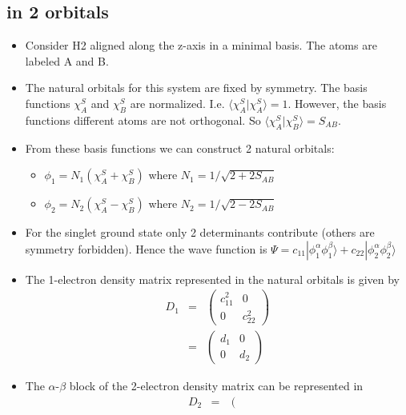 \documentclass[aip,graphicx]{revtex4-1}
\begin{document}
\subsection{ in 2 orbitals}

\begin{itemize}
\item Consider H2 aligned along the z-axis in a minimal basis. The atoms are labeled A and B.
\item The natural orbitals for this system are fixed by symmetry. The basis functions $\chi_A^S$ and 
        $\chi_B^S$ are normalized. I.e. $\langle \chi_A^S|\chi_A^S\rangle = 1$. However, the basis 
        functions  different atoms are not orthogonal. So $\langle \chi_A^S|\chi_B^S\rangle = S_{AB}$.
\item From these basis functions we can construct 2 natural orbitals:
         \begin{itemize}
         \item $\phi_1 = N_1 \left(\chi_A^S + \chi_B^S\right)$ where $N_1 = 1/\sqrt{2+2S_{AB}}$
         \item $\phi_2 = N_2 \left(\chi_A^S - \chi_B^S\right)$ where $N_2 = 1/\sqrt{2-2S_{AB}}$
         \end{itemize}
\item For the singlet ground state only 2 determinants contribute (others are symmetry forbidden). Hence  
        the wave function is 
        $\Psi = c_{11}|\phi_1^\alpha\phi_1^\beta\rangle + c_{22}|\phi_2^\alpha\phi_2^\beta\rangle $
\item The 1-electron density matrix represented in the natural orbitals is given by
         \begin{eqnarray}
         D_{1} &=&
         \left(\begin{matrix}
         c_{11}^2 & 0 \\
         0 & c_{22}^2
         \end{matrix}\right) \\
         &=&
         \left(\begin{matrix}
         d_{1} & 0 \\
         0 & d_{2}
         \end{matrix}\right)
         \end{eqnarray}
\item The $\alpha$-$\beta$ block of the 2-electron density matrix can be represented in
        \begin{eqnarray}
         D_{2} &=&
         \left(\begin{matrix}

\end{matrix}
\end{eqnarray}
\end{itemize}
\end{document}
